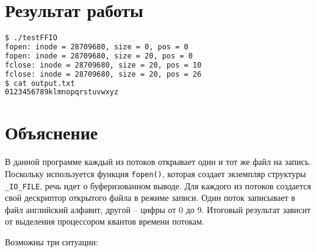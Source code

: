 \section{Результат работы}

\begin{lstlisting}[language=Bash]
$ ./testFFIO
fopen: inode = 28709680, size = 0, pos = 0
fopen: inode = 28709680, size = 20, pos = 0
fclose: inode = 28709680, size = 20, pos = 10
fclose: inode = 28709680, size = 20, pos = 26
$ cat output.txt
0123456789klmnopqrstuvwxyz
\end{lstlisting}

\section{Объяснение}

В данной программе каждый из потоков открывает один и тот же файл на запись. Поскольку используется функция \texttt{fopen()}, которая создает экземпляр структуры \texttt{\_IO\_FILE}, речь идет о буферизованном выводе. Для каждого из потоков создается свой дескриптор открытого файла в режиме записи. Один поток записывает в файл английский алфавит, другой -- цифры от 0 до 9. Итоговый результат зависит от выделения процессором квантов времени потокам. 

Возможны три ситуации:

